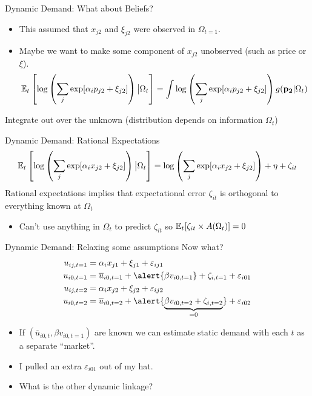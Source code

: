 \begin{frame}{Dynamic Demand: What about Beliefs?}
\begin{itemize}
\item This assumed that $x_{j2}$ and $\xi_{j2}$ were observed in $\Omega_{t=1}$.
\item Maybe we want to make some component of $x_{j2}$ \alert{unobserved} (such as price or $\xi$).
$$
\mathbb{E}_t\left[ \log \left( \sum_j \exp [ \alpha_i p_{j2}  +  \xi_{j2} ] \right)\big| \Omega_t\right]= 
\int \log \left( \sum_j \exp [ \alpha_i p_{j2}  +  \xi_{j2} ] \right)  g(\mathbf{p_2} | \Omega_t) 
$$
\end{itemize}
Integrate out over the unknown (distribution depends on information $\Omega_t$)
\end{frame}

\begin{frame}{Dynamic Demand: Rational Expectations}
$$
\mathbb{E}_t\left[ \log \left( \sum_j \exp [ \alpha_i x_{j2}  +  \xi_{j2} ] \right)\big| \Omega_t\right]= 
\log \left( \sum_j \exp [ \alpha_i x_{j2}  +  \xi_{j2} ] \right)  + \eta+  \zeta_{it}
$$
Rational expectations implies that expectational error $\zeta_{it}$ is orthogonal to everything known at $\Omega_t$
\begin{itemize}
\item Can't use anything in $\Omega_t$ to predict $\zeta_{it}$ so $\mathbb{E}_t[\zeta_{it} \times A(\Omega_t)]=0$
\end{itemize}
\end{frame}

\begin{frame}{Dynamic Demand: Relaxing some assumptions}
Now what?
\begin{align*}
u_{ij,t=1} &=   \alpha_i x_{j1}  +  \xi_{j1} + \varepsilon_{ij1}\\
u_{i0,t=1} &=  \overline{u}_{i0,t=1}+  \alert{\beta v_{i0,t=1}} + \zeta_{i,t=1}+ \varepsilon_{i01} \\
u_{ij,t=2} &=   \alpha_i x_{j2}  +  \xi_{j2} + \varepsilon_{ij2}\\
u_{i0,t=2} &= \overline{u}_{i0,t=2} +  \alert{\underbrace{\beta v_{i0,t=2}+ \zeta_{i,t=2} }_{=0}}+\varepsilon_{i02} 
\end{align*}
\vspace{-.5cm}
\begin{itemize}
\item If $(\overline{u}_{i0,t}, \beta v_{i0,t=1})$ are known we can estimate static demand with each $t$ as a separate ``market''.
\item I pulled an extra $\varepsilon_{i01}$ out of my hat.
\item What is the other dynamic linkage?
\end{itemize}
\end{frame}


